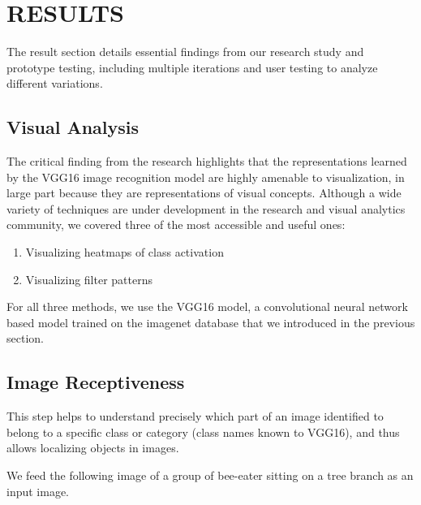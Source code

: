 \chapter{RESULTS}

\graphicspath{ {./results/} }
\thispagestyle{empty}


The result section details essential findings from our research study and prototype testing, including multiple iterations and user testing to analyze different variations.

\section{Visual Analysis}

The critical finding from the research highlights that the representations learned by the VGG16 image recognition model are highly amenable to visualization, in large part because they are representations of visual concepts. Although a wide variety of techniques are under development in the research and visual analytics community, we covered three of the most accessible and useful ones:

\begin{enumerate}
\item Visualizing heatmaps of class activation
\item Visualizing filter patterns
\end{enumerate}

For all three methods, we use the VGG16 model, a convolutional neural network based model trained on the imagenet database that we introduced in the previous section.

\section*{Image Receptiveness}

This step helps to understand precisely which part of an image identified to belong to a specific class or category (class names known to VGG16), and thus allows localizing objects in images.

We feed the following image of a group of bee-eater sitting on a tree branch as an input image.

